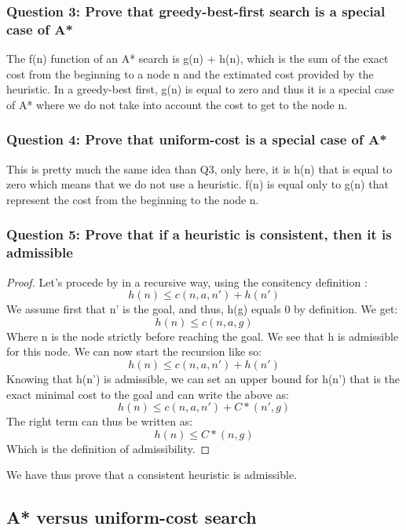 \documentclass[a4paper,10pt]{article}
\begin{document}
			\subsubsection{Question 3: Prove that greedy-best-first search is a special case of A*}
				The f(n) function of an A* search is g(n) + h(n), which is the sum of the exact cost from the beginning to a node n and the extimated cost provided by the heuristic. In a greedy-best first, g(n) is equal to zero and thus it is a special case of A* where we do not take into account the cost to get to the node n. 
			\subsubsection{Question 4: Prove that uniform-cost is a special case of A*}
				This is pretty much the same idea than Q3, only here, it is h(n) that is equal to zero which means that we do not use a heuristic. f(n) is equal only to g(n) that represent the cost from the beginning to the node n.\\
			
			\subsubsection{Question 5: Prove that if a heuristic is consistent, then it is admissible}
			
				\begin{proof}
					Let's procede by in a recursive way, using the consitency definition :						$$ h(n) \leq c(n,a,n') + h(n') $$
					We assume first that n' is the goal, and thus, h(g) equals 0 by definition. We get:
					$$ h(n) \leq c(n,a,g) $$
					Where n is the node strictly before reaching the goal. We see that h is admissible for this node. We can now start the recursion like so:
					$$ h(n) \leq c(n,a,n') + h(n') $$
					Knowing that h(n') is admissible, we can set an upper bound for h(n') that is the exact minimal cost to the goal and can write the above as:
					$$ h(n) \leq c(n,a,n') + C*(n', g) $$
					The right term can thus be written as:
					$$ h(n) \leq C*(n, g) $$
					Which is the definition of admissibility.        
				\end{proof}
				We have thus prove that a consistent heuristic is admissible.
				
		\subsection{A* versus uniform-cost search}
\end{document}
